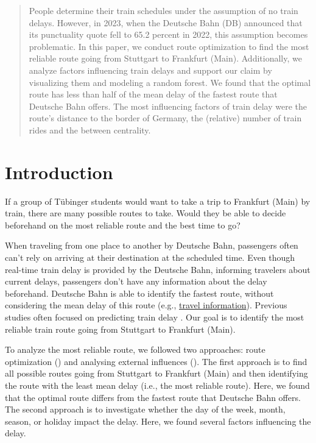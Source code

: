 \documentclass{article}
\theoremstyle{plain}
\theoremstyle{definition}
\theoremstyle{remark}
\begin{document}
\printAffiliationsAndNotice{\icmlEqualContribution} %

\begin{abstract}
People determine their train schedules under the assumption of no train delays. However, in 2023, when the Deutsche Bahn (DB) announced that its punctuality quote fell to 65.2 percent in 2022, this assumption becomes problematic. In this paper, we conduct route optimization to find the most reliable route going from Stuttgart to Frankfurt (Main). Additionally, we analyze factors influencing train delays and support our claim by visualizing them and modeling a random forest. We found that the optimal route has less than half of the mean delay of the fastest route that Deutsche Bahn offers. The most influencing factors of train delay were the route's distance to the border of Germany, the (relative) number of train rides and the between centrality.

\end{abstract}

\section{Introduction}\label{sec:intro}
If a group of Tübinger students would want to take a trip to Frankfurt (Main) by train, there are many possible routes to take. Would they be able to decide beforehand on the most reliable route and the best time to go?

When traveling from one place to another by Deutsche Bahn, passengers often can't rely on arriving at their destination at the scheduled time. Even though real-time train delay is provided by the Deutsche Bahn, informing travelers about current delays, passengers don't have any information about the delay beforehand. Deutsche Bahn is able to identify the fastest route, without considering the mean delay of this route (e.g., \href{https://www.bahn.de/buchung/intern/start}{travel information}). Previous studies often focused on predicting train delay \cite{predtraindelay, largetrainnet, MLtraindel}. Our goal is to identify the most reliable train route going from Stuttgart to Frankfurt (Main).

To analyze the most reliable route, we followed two approaches: route optimization () and analysing external influences (). The first approach is to find all possible routes going from Stuttgart to Frankfurt (Main) and then identifying the route with the least mean delay (i.e., the most reliable route). Here, we found that the optimal route differs from the fastest route that Deutsche Bahn offers. The second approach is to investigate whether the day of the week, month, season, or holiday impact the delay. Here, we found several factors influencing the delay. 
\end{document}
